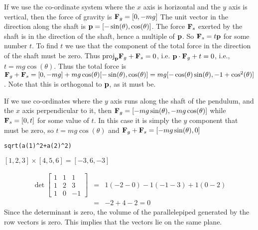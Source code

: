 \vspace{2mm}
If we use the co-ordinate system where the $x$ axis is horizontal
and the $y$ axis is vertical, then the force of gravity is ${\bf F}_g=[0,-mg]$
The unit vector in the direction along the shaft is
${\bf p}=[-\sin(\theta),\cos(\theta)]$. The
force ${\bf F}_s$ exerted by the shaft is in the direction of the shaft,
hence a multiple of
${\bf p}$. So ${\bf F}_s = t{\bf p}$ for some number $t$. To find $t$ we use
that the component of the total force in the direction of the shaft must be
zero. Thus ${\rm proj}_{\bf p}{\bf F}_g +  {\bf F}_s = 0$, i.e.
${\bf p}\cdot{\bf F}_g + t=0$, i.e., $t=mg\cos(\theta)$. Thus the total force
is $ {\bf F}_g+{\bf F}_s=[0,-mg]+mg\cos(\theta)[-\sin(\theta),\cos(\theta)]
=mg[-\cos(\theta)\sin(\theta), -1+\cos^2(\theta)]$. Note that this is orthogonal
to ${\bf p}$, as it must be.

If we use co-ordinates where the $y$ axis runs along the shaft of the pendulum,
and the $x$ axis perpendicular to it, then
${\bf F}_g=[-mg\sin(\theta),-mg\cos(\theta)]$ while ${\bf F}_s=[0,t]$ for some
value of $t$. In this case it is simply the $y$ component that must be zero,
so $t=mg\cos(\theta)$ and ${\bf F}_g+{\bf F}_s=[-mg\sin(\theta),0]$


\vspace{2mm}
\begin{verbatim}
sqrt(a(1)^2+a(2)^2)  
\end{verbatim}



\vspace{2mm}
$[1,2,3]\times [4,5,6]=[-3,6,-3]$

\vspace{2mm}
\begin{eqnarray*}
\det \left[ \begin{array}{ccc}
	1& 1& 1 \\
	1& 2& 3 \\
	1& 0& -1
	    \end{array}
\right] &=& 1(-2-0) - 1(-1-3) + 1(0-2)\\
&=& -2+4-2 = 0
\end{eqnarray*}
Since the determinant is zero, the volume of the parallelepiped generated by the row vectors is zero. This implies that the vectors lie on the same plane.

